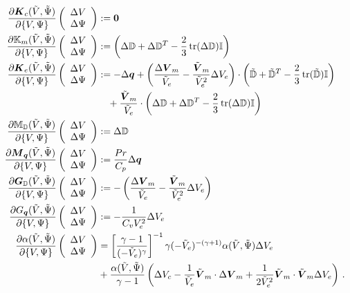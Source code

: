 \documentclass[Dissertation.tex]{subfiles}
\begin{document}
\begin{align*}
\pd{\bfK_c(\tilde V,\tilde\Psi)}{\{V,\Psi\}}\vecttwo{\Delta V}{\Delta\Psi}&:=
	\boldsymbol 0\\
\pd{\bbK_m(\tilde V,\tilde\Psi)}{\{V,\Psi\}}\vecttwo{\Delta V}{\Delta\Psi}&:=
	\LRp{\Delta\bbD+\Delta\bbD^T-\frac{2}{3}\trace(\Delta\bbD)\bbI}
	\\
\pd{\bfK_e(\tilde V,\tilde\Psi)}{\{V,\Psi\}}\vecttwo{\Delta V}{\Delta\Psi}&:=
	-\Delta\bfq+
	\LRp{\frac{\Delta\bfV_m}{\tilde V_e}-\frac{\tilde\bfV_m}{\tilde V_e^2}\Delta V_e}
	\cdot\LRp{\tilde\bbD+\tilde\bbD^T-\frac{2}{3}\trace(\tilde\bbD)\bbI}
	\\&\quad
	+\frac{\tilde\bfV_m}{\tilde V_e}\cdot\LRp{\Delta\bbD+\Delta\bbD^T-\frac{2}{3}\trace(\Delta\bbD)\bbI}\\
\pd{\bbM_{\bbD}(\tilde V,\tilde\Psi)}{\{V,\Psi\}}\vecttwo{\Delta V}{\Delta\Psi}&:=
	\Delta\bbD
	\\
\pd{\bfM_{\bfq}(\tilde V,\tilde\Psi)}{\{V,\Psi\}}\vecttwo{\Delta V}{\Delta\Psi}&:=
	\frac{Pr}{C_p}\Delta\bfq
	\\
\pd{\bfG_{\bbD}(\tilde V,\tilde\Psi)}{\{V,\Psi\}}\vecttwo{\Delta V}{\Delta\Psi}&:=
	-\LRp{\frac{\Delta\bfV_m}{\tilde V_e}-\frac{\tilde\bfV_m}{\tilde V_e^2}\Delta V_e}
	\\
\pd{G_{\bfq}(\tilde V,\tilde\Psi)}{\{V,\Psi\}}\vecttwo{\Delta V}{\Delta\Psi}&:=
	-\frac{1}{C_vV_e^2}\Delta V_e
	\\
\pd{\alpha(\tilde V,\tilde\Psi)}{\{V,\Psi\}}\vecttwo{\Delta V}{\Delta\Psi}&=
\LRs{\frac{\gamma-1}{(-\tilde V_e)^\gamma}}^{-1}
\gamma(-\tilde V_e)^{-(\gamma+1)}
\alpha(\tilde V,\tilde\Psi)
\Delta V_e\\
&+
\frac{\alpha(\tilde V,\tilde\Psi)}{\gamma-1}
\LRp{\Delta V_c
-\frac{1}{\tilde V_e}\tilde\bfV_m\cdot\Delta\bfV_m
+\frac{1}{2\tilde V_e^2}\tilde\bfV_m\cdot\tilde\bfV_m\Delta V_e
}\,.
\end{align*}
\end{document}
